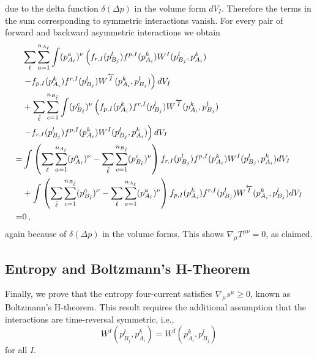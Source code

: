 due to the delta function $\delta(\Delta p)$ in the volume form $dV_I$.  Therefore the terms in the sum  corresponding to symmetric interactions vanish.  For every pair of forward and backward asymmetric interactions we obtain
\begin{align}
&\sum_\ell\sum_{a=1}^{n_{A_\ell}}\int (p_{A_\ell}^a)^{\nu}\left(f_{r,I}(p_{B_j}^l)f^{p,I}(p_{A_i}^k)W^I(p_{B_j}^l,p_{A_i}^k) \right.\\
&\left. -f_{p,I}(p_{A_i}^k)f^{r,I}(p_{B_j}^l)W^{\overleftarrow{I}}(p_{A_i}^k,p_{B_j}^l)\right)  dV_I\notag\\
&+\sum_{\tilde\ell}\sum_{c=1}^{n_{B_{\tilde\ell}}} \int (p_{B_{\tilde\ell}}^c)^{\nu}\left(f_{p,I}(p_{A_i}^k)f^{r,I}(p_{B_j}^l)W^{\overleftarrow{I}}(p_{A_i}^k,p_{B_j}^l) \right.\notag\\
&\left. -f_{r,I}(p_{B_j}^l)f^{p,I}(p_{A_i}^k)W^I(p_{B_j}^l,p_{A_i}^k)\right)  dV_I\notag\\
=&\int\left( \sum_\ell\sum_{a=1}^{n_{A_\ell}}(p_{A_\ell}^a)^{\nu} -\sum_{\tilde \ell}\sum_{c=1}^{n_{B_{\tilde\ell}}} (p_{B_{\tilde\ell}}^c)^{\nu}\right)f_{r,I}(p_{B_j}^l)f^{p,I}(p_{A_i}^k)W^I(p_{B_j}^l,p_{A_i}^k)  dV_I\notag\\
&+\int \left(\sum_{\tilde\ell}\sum_{c=1}^{n_{B_{\tilde\ell}}}(p_{B_{\tilde\ell}}^c)^{\nu}-\sum_\ell\sum_{a=1}^{n_{A_\ell}}(p_{A_\ell}^a)^{\nu}\right)f_{p,I}(p_{A_i}^k)f^{r,I}(p_{B_j}^l)W^{\overleftarrow{I}}(p_{A_i}^k,p_{B_j}^l) dV_I\notag\\
=&0\,,\notag
\end{align}
again because of $\delta(\Delta p)$ in the volume forms.  This shows $\nabla_\mu T^{\mu\nu}=0$, as claimed.

\subsection{Entropy and Boltzmann's H-Theorem}
Finally, we prove that the entropy four-current satisfies $\nabla_\mu s^\mu\geq 0$, known as Boltzmann's H-theorem. This result requires the additional assumption that the interactions are time-reversal symmetric,  i.e.,
\begin{equation}\label{time_symmetry}
W^I(p_{B_j}^l,p_{A_i}^k)=W^{\overleftarrow{I}}(p_{A_i}^k,p_{B_j}^l)
\end{equation}
for all $I$.  

